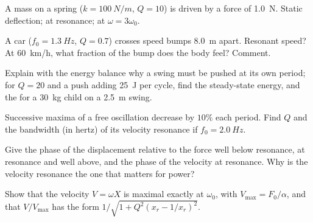 \begin{exercise}[$\star$]\label{exo:b1:oscillators-resonance:4}
A mass on a spring ($k = \qty{100}{N/m}$, $Q = 10$) is driven by a force
of  \qty{1.0}{N}. Static deflection;  at resonance;
 at $\omega = 3\omega_0$.
\end{exercise}

\begin{exercise}[$\star\star$]\label{exo:b1:oscillators-resonance:5}
A car ($f_0 = \qty{1.3}{Hz}$, $Q = 0.7$) crosses speed bumps \qty{8.0}{m}
apart. Resonant speed? At \qty{60}{km/h}, what fraction of the bump
 does the body feel? Comment.
\end{exercise}

\begin{exercise}[$\star\star$]\label{exo:b1:oscillators-resonance:6}
Explain with the energy balance why a swing must be pushed at its own
period; for $Q = 20$ and a push adding \qty{25}{J} per cycle, find the
steady-state energy, and the  for a \qty{30}{kg} child on a
\qty{2.5}{m} swing.
\end{exercise}

\begin{exercise}[$\star\star$]\label{exo:b1:oscillators-resonance:7}
Successive maxima of a free oscillation decrease by $10\%$ each period.
Find $Q$ and the bandwidth (in hertz) of its velocity resonance if
$f_0 = \qty{2.0}{Hz}$.
\end{exercise}

\begin{exercise}[$\star\star$]\label{exo:b1:oscillators-resonance:8}
Give the phase of the displacement relative to the force well below
resonance, at resonance and well above, and the phase of the velocity
at resonance. Why is the velocity resonance the one that matters for
power?
\end{exercise}

\begin{exercise}[$\star\star$]\label{exo:b1:oscillators-resonance:9}
Show that the velocity  $V = \omega X$ is maximal exactly at
$\omega_0$, with $V_{\max} = F_0/\alpha$, and that $V/V_{\max}$ has the
form $1/\sqrt{1 + Q^2(x_r - 1/x_r)^2}$.
\end{exercise}

